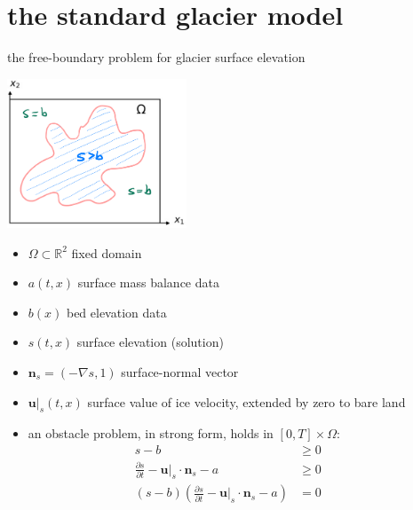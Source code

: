 \documentclass[10pt,svgnames]{beamer}
\newcommand{\bn}{\mathbf{n}}
\newcommand{\bu}{\mathbf{u}}
\newcommand{\RR}{\mathbb{R}}
\newcommand{\grad}{\nabla}
\begin{document}
\section{the standard glacier model}

\begin{frame}{the free-boundary problem for glacier surface elevation}

\hfill \includegraphics[width=0.4\textwidth]{mapplane}

\vspace{-39mm}

\begin{minipage}[t]{60mm}
{\small
\begin{itemize}
\item $\Omega \subset \RR^2$ fixed domain
\item $a(t,x)$ surface mass balance data
\item $b(x)$ bed elevation data
\item $s(t,x)$ surface elevation (solution)
\item $\bn_s = (- \grad s,1)$ surface-normal vector
\item $\bu|_s(t,x)$ surface value of ice velocity, extended by zero to bare land
\end{itemize}
}
\end{minipage}

\begin{itemize}
\item an obstacle problem, in strong form, holds in $[0,T] \times \Omega$:
\begin{align*}
s - b &\ge 0 &&\phantom{x} \\
\frac{\partial s}{\partial t} - \bu|_s \cdot \bn_s - a &\ge 0 \\
(s - b) \left(\frac{\partial s}{\partial t} - \bu|_s \cdot \bn_s - a\right) &= 0
\end{align*}
\end{itemize}
\end{frame}
\end{document}
